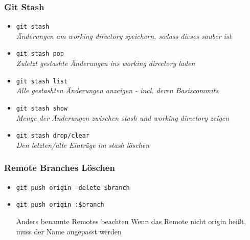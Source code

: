 \documentclass{beamer}
\begin{document}
\begin{frame}
	\frametitle{Git Stash}
	\begin{itemize}
		\item{\texttt{git stash}\\ \small{\textit{Änderungen am working directory speichern, sodass dieses sauber ist}}}
		\item{\texttt{git stash pop}\\ \small{\textit{Zuletzt gestashte Änderungen ins working directory laden}}}
		\item{\texttt{git stash list}\\ \small{\textit{Alle gestashten Änderungen anzeigen - incl. deren Basiscommits}}}
		\item{\texttt{git stash show}\\ \small{\textit{Menge der Änderungen zwischen stash und working directory zeigen}}}
		\item{\texttt{git stash drop/clear}\\ \small{\textit{Den letzten/alle Einträge im stash löschen}}}
	\end{itemize}
\end{frame}

\begin{frame}
	\frametitle{Remote Branches Löschen}
	\begin{itemize}
		\item{\texttt{git push origin --delete \$branch}}
		\item{\texttt{git push origin :\$branch}}
			\begin{block}{\small{Anders benannte Remotes beachten}}
				\small{Wenn das Remote nicht origin heißt, muss der Name angepasst werden}
			\end{block}
	\end{itemize}
\end{frame}

\end{document}
